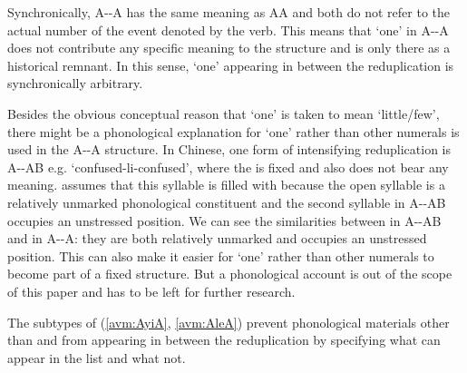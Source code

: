 {Synchronically, A--A has the same meaning as AA and both do not refer to the actual number of the event denoted by the verb.
This means that  `one' in A--A does not contribute any specific meaning to the structure
and is only there as a historical remnant.
In this sense,   `one' appearing in between the reduplication is synchronically arbitrary. %

Besides the obvious conceptual reason that   `one' is taken to mean `little/few',
there might be a phonological explanation for   `one' rather than other numerals is used in the A--A structure.
In Chinese, one form of intensifying reduplication is A--AB e.g.  `confused-li-confused',
where the  is fixed and also does not bear any meaning.
\citet[137]{Sui2018} assumes that this syllable is filled with  because the open syllable  is a relatively unmarked phonological constituent \citep{Yip1992}
and the second syllable in A--AB occupies an unstressed position.
We can see the similarities between  in A--AB and  in A--A: they are both relatively unmarked and occupies an unstressed position.
This can also make it easier for   `one' rather than other numerals to become part of a fixed structure.
But a phonological account is out of the scope of this paper and has to be left for further research.

The subtypes of  (\ref{avm:AyiA}, \ref{avm:AleA}) prevent phonological materials other than  and  from appearing in between the reduplication by specifying what can appear in the \etag list and what not.
}


\ea\label{avm:AleA}
\ea    %
         \impl\\
\ex   %
\label{avm:a-le-a-lr}
     \impl\\
\z
\z

